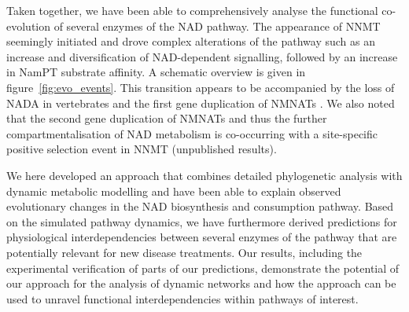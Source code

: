 
Taken together, we have been able to comprehensively analyse the functional co-evolution of several enzymes of the NAD pathway. The appearance of NNMT seemingly initiated and drove complex alterations of the pathway such as an increase and diversification of NAD-dependent signalling, followed by an increase in NamPT substrate affinity. A schematic overview is given in figure~\ref{fig:evo_events}. This transition appears to be accompanied by the loss of NADA in vertebrates and the first gene duplication of NMNATs \cite{Lau2010}. We also noted that the second gene duplication of NMNATs and thus the further compartmentalisation of NAD metabolism is co-occurring with a site-specific positive selection event in NNMT (unpublished results).

We here developed an approach that combines detailed phylogenetic analysis with dynamic metabolic modelling and have been able to explain observed evolutionary changes in the NAD biosynthesis and consumption pathway. Based on the simulated pathway dynamics, we have furthermore derived predictions for physiological interdependencies between several enzymes of the pathway that are potentially relevant for new disease treatments. Our results, including the experimental verification of parts of our predictions, demonstrate the potential of our approach for the analysis of dynamic networks and how the approach can be used to unravel functional interdependencies within pathways of interest.
